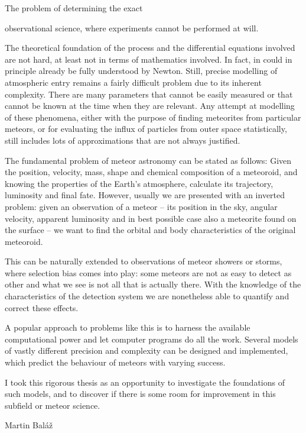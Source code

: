 
The problem of determining the exact

observational science, where experiments cannot be performed at will.

The theoretical foundation of the process and the differential equations involved
are not hard, at least not in terms of mathematics involved. In fact, in could in principle already be fully understood by Newton.
Still, precise modelling of atmospheric entry remains a fairly difficult problem due to its inherent complexity.
There are many parameters that cannot be easily measured or that cannot be known at the time when they are relevant.
Any attempt at modelling of these phenomena, either with the purpose of finding meteorites from particular meteors,
or for evaluating the influx of particles from outer space statistically,
still includes lots of approximations that are not always justified.

The fundamental problem of meteor astronomy can be stated as follows:
Given the position, velocity, mass, shape and chemical composition of a meteoroid,
and knowing the properties of the Earth's atmosphere, calculate its trajectory, luminosity and final fate.
However, usually we are presented with an inverted problem: given an observation of a
meteor -- its position in the sky, angular velocity, apparent luminosity and in best possible case also
a meteorite found on the surface -- we want to find the orbital and body characteristics of the original meteoroid.

This can be naturally extended to observations of meteor showers or storms,
where selection bias comes into play: some meteors are not as easy to detect as other
and what we see is not all that is actually there. With the knowledge of the characteristics
of the detection system we are nonetheless able to quantify and correct these effects.

A popular approach to problems like this is to harness the available computational
power and let computer programs do all the work. Several models of vastly different precision and complexity
can be designed and implemented, which predict the behaviour of meteors with varying success.


I took this rigorous thesis as an opportunity to investigate the foundations
of such models, and to discover if there is some room for improvement in this subfield or meteor science.

\hfill Martin Baláž
